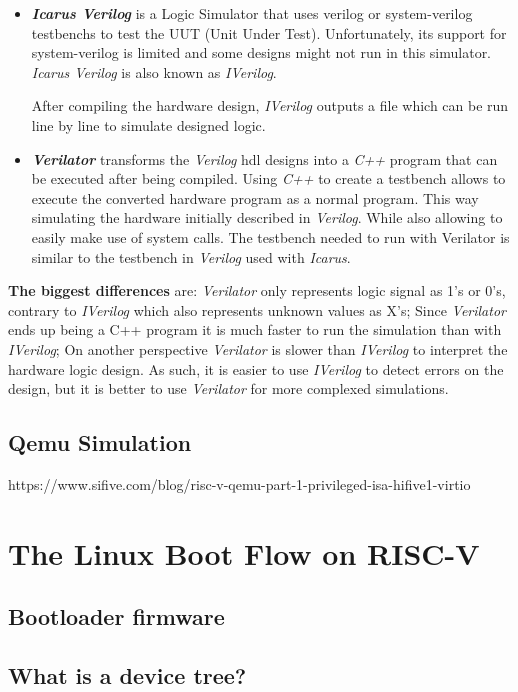 \begin{itemize}
    \item \textbf{\textit{Icarus Verilog}} is a Logic Simulator that uses verilog or system-verilog testbenchs to test the UUT (Unit Under Test). Unfortunately, its support for system-verilog is limited and some designs might not run in this simulator. \textit{Icarus Verilog} is also known as \textit{IVerilog}.
    
    After compiling the hardware design, \textit{IVerilog} outputs a file which can be run line by line to simulate designed logic.
    
    \item \textbf{\textit{Verilator}} transforms the \textit{Verilog} \acrshort{hdl} designs into a \textit{C++} program that can be executed after being compiled. Using \textit{C++} to create a testbench allows to execute the converted hardware program as a normal program. This way simulating the hardware initially described in \textit{Verilog}. While also allowing to easily make use of system calls. The testbench needed to run with Verilator is similar to the testbench in \textit{Verilog} used with \textit{Icarus}.
\end{itemize}

\textbf{The biggest differences} are: \textit{Verilator} only represents logic signal as 1's or 0's, contrary to \textit{IVerilog} which also represents unknown values as X's; Since \textit{Verilator} ends up being a C++ program it is much faster to run the simulation than with \textit{IVerilog}; On another perspective \textit{Verilator} is slower than \textit{IVerilog} to interpret the hardware logic design.
As such, it is easier to use \textit{IVerilog} to detect errors on the design, but it is better to use \textit{Verilator} for more complexed simulations.

\subsection{Qemu Simulation}
https://www.sifive.com/blog/risc-v-qemu-part-1-privileged-isa-hifive1-virtio

\section{The Linux Boot Flow on RISC-V}
\label{section:linux_boot_flow}
\subsection{Bootloader firmware}
\subsection{What is a device tree?}


